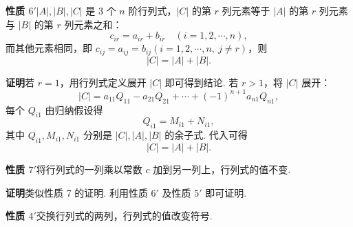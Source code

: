 \documentclass[UTF8, 12pt, fontset=fandol, oneside]{ctexart}
\begin{document}
\noindent\textbf{性质 $6'$}\quad $|A|,|B|,|C|$ 是 3 个 $n$ 阶行列式，$|C|$ 的第 $r$ 列元素等于 $|A|$ 的第 $r$ 列元素与 $|B|$ 的第 $r$ 列元素之和：
\[
c_{ir}=a_{ir}+b_{ir}\quad (i=1,2,\cdots,n),
\]
而其他元素相同，即 $c_{ij}=a_{ij}=b_{ij}(i=1,2,\cdots,n,\ j\ne r)$，则
\[
|C|=|A|+|B|.
\]

\noindent\textbf{证明}\quad 若 $r=1$，用行列式定义展开 $|C|$ 即可得到结论. 若 $r>1$，将 $|C|$ 展开：
\[
|C|=a_{11}Q_{11}-a_{21}Q_{21}+\cdots+(-1)^{n+1}a_{n1}Q_{n1},
\]
每个 $Q_{i1}$ 由归纳假设得
\[
Q_{i1}=M_{i1}+N_{i1},
\]
其中 $Q_{i1},M_{i1},N_{i1}$ 分别是 $|C|,|A|,|B|$ 的余子式. 代入可得
\[
|C|=|A|+|B|.
\]

\noindent\textbf{性质 $7'$}\quad 将行列式的一列乘以常数 $c$ 加到另一列上，行列式的值不变.

\noindent\textbf{证明}\quad 类似性质 7 的证明. 利用性质 $6'$ 及性质 $5'$ 即可证明.

\noindent\textbf{性质 $4'$}\quad 交换行列式的两列，行列式的值改变符号.
\end{document}
